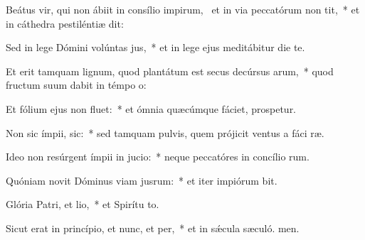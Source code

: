 \item Beátus vir, qui non ábiit in consílio impirum,~\pscross{} et in via peccatórum non tit,~* et in cáthedra pestiléntiæ  dit:
\item Sed in lege Dómini volúntas jus,~* et in lege ejus meditábitur die  te.
\item Et erit tamquam lignum, quod plantátum est secus decúrsus arum,~* quod fructum suum dabit in témpo o:
\item Et fólium ejus non fluet:~* et ómnia quæcúmque fáciet, prospetur.
\item Non sic ímpii,  sic:~* sed tamquam pulvis, quem prójicit ventus a fáci ræ.
\item Ideo non resúrgent ímpii in jucio:~* neque peccatóres in concílio rum.
\item Quóniam novit Dóminus viam jusrum:~* et iter impiórum bit.
\item Glória Patri, et lio,~* et Spirítu to.
\item Sicut erat in princípio, et nunc, et per,~* et in sǽcula sæculó. men.
